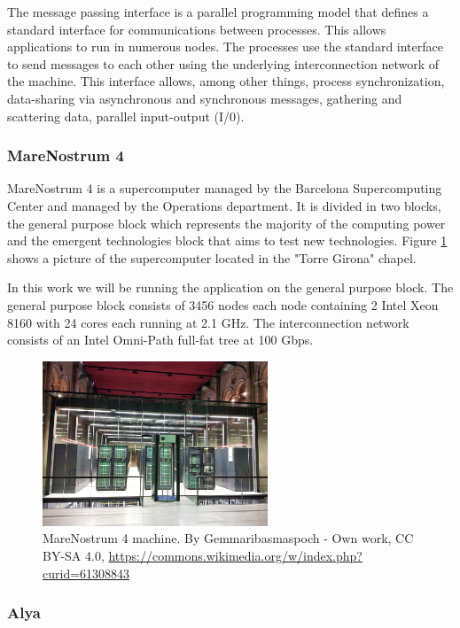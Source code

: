 \justify
The message passing interface \cite{mpi} is a parallel programming model that defines a standard  interface for communications between processes. This allows applications to run in numerous nodes. The processes use the standard interface to send messages to each other using the underlying interconnection network of the machine. This interface allows, among other things, process synchronization, data-sharing via asynchronous and synchronous messages, gathering and scattering data, parallel input-output (I/0).

\subsubsection{MareNostrum 4}

\justify
MareNostrum 4 \cite{mn4} is a supercomputer managed by the Barcelona Supercomputing Center and managed by the Operations department. It is divided in two blocks, the general purpose block which represents the majority of the computing power and the emergent technologies block that aims to test new technologies. Figure \ref{fig:mn4} shows a picture of the supercomputer located in the "Torre Girona" chapel.

\justify
In this work we will be running the application on the general purpose block.
The general purpose block consists of 3456 nodes each node containing 2 Intel Xeon 8160 with 24 cores each running at 2.1 GHz. The interconnection network consists of an Intel Omni-Path full-fat tree at 100 Gbps.

\begin{figure}[htbp]
  \centering
  \includegraphics[width=0.6\textwidth]{mn4}
  \caption[MareNostrum4 machine]{MareNostrum 4 machine. {By Gemmaribasmaspoch - Own work, CC BY-SA 4.0, \url{https://commons.wikimedia.org/w/index.php?curid=61308843}}}
  \label{fig:mn4}
\end{figure}

\subsubsection{Alya}

